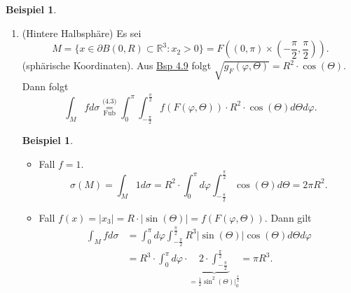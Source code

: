 \documentclass[a4paper]{scrreprt}
\newcommand{\R}{\mathbb{R}}
\newcommand{\overunderset}[3]{\overset{#1}{\underset{#3}{#2}}}
\newcommand{\jlabel}[1]{\label{j_#1}}
\newcommand{\jshortlink}[1]{\jhyperref{#1}{\text{#1}}}
\newcommand{\jhyperref}[2]{\hyperref[j_#1]{#2}}
\newcommand{\jlink}[1]{\jhyperref{#1}{#1}}
\newcommand{\jshortlinkFubini}{\jhyperref{Fubini}{\text{Fub}}}
\theoremstyle{plain}
\theoremstyle{definition}
\newtheorem{expl}[thm]{Beispiel}
\newtheorem*{expl*}{Beispiel}
\begin{document}
{{{{\jlabel{Bsp 4.10}
\begin{expl}
    \begin{enumerate}
        \item 
            \jlabel{Bsp 4.10a)}
            (Hintere Halbsphäre) Es sei
            \[
                M = \{x\in \partial B(0,R) \subset \R^3 : x_2 > 0\} = F\left((0,\pi) \times \left(-\frac{\pi}{2},\frac{\pi}{2}\right)\right).
            \]
            (sphärische Koordinaten). Aus \jlink{Bsp 4.9} folgt $\sqrt{g_F(\varphi,\Theta)} = R^2\cdot \cos(\Theta)$. Dann folgt
            \[
                \int_M f d\sigma \overunderset{\jshortlink{(4.3)}}{=}{\jshortlinkFubini} \int_0^\pi\int_{-\frac{\pi}{2}}^{\frac{\pi}{2}} f(F(\varphi,\Theta))\cdot R^2\cdot \cos(\Theta) d\Theta d\varphi.
            \]
            \begin{expl*}
                \begin{itemize}
                    \item Fall $f=1$.
                        \[
                            \sigma(M) = \int_M 1 d\sigma = R^2\cdot \int_0^\pi d\varphi \int_{-\frac{\pi}{2}}^{\frac{\pi}{2}} \cos(\Theta) d\Theta = 2\pi R^2.
                        \]
                    \item Fall $f(x) = |x_3| = R\cdot |\sin(\Theta)| = f(F(\varphi, \Theta))$. Dann gilt
                        \[
                            \begin{split}
                                \int_M f d\sigma &= \int_0^\pi d\varphi \int_{-\frac{\pi}{2}}^{\frac{\pi}{2}} R^3 |\sin(\Theta)| \cos(\Theta) d\Theta d\varphi\\
                                                 &= R^3\cdot \int_0^\pi d\varphi \cdot \underbrace{2\cdot \int_{-\frac{\pi}{2}}^{\frac{\pi}{2}}}_{=\frac{1}{2}\sin^2(\Theta)|_0^\frac{\pi}{2}} = \pi R^3.
                            \end{split}
                        \]
                \end{itemize}
            \end{expl*}
        

\end{enumerate}
\end{expl}}}}}
\end{document}
